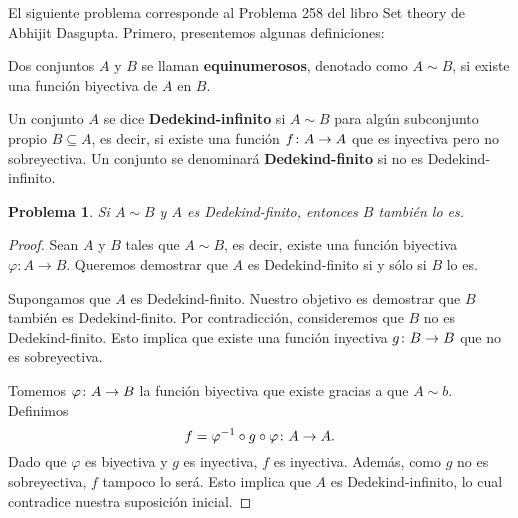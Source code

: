 \documentclass[a4,10pt]{aleph-notas}
\newtheorem*{prob}{Problema}
\begin{document}
\encabezado

\noindent
El siguiente problema corresponde al Problema 258 del libro Set theory de Abhijit Dasgupta. Primero, presentemos algunas definiciones:

\begin{defi}
    Dos conjuntos $A$ y $B$ se llaman \textbf{equinumerosos}, denotado como $A \sim B$, si existe una función biyectiva de $A$ en $B$.
\end{defi}

\begin{defi}
    Un conjunto $A$ se dice \textbf{Dedekind-infinito} si $A \sim B$ para algún subconjunto propio $B \subseteq A$, es decir, si existe una función $f\colon A \rightarrow A$ que es inyectiva pero no sobreyectiva. Un conjunto se denominará \textbf{Dedekind-finito} si no es Dedekind-infinito.
\end{defi}

\begin{prob}
    Si $A\sim B$ y $A$ es Dedekind-finito, entonces $B$ también lo es.
\end{prob}

\begin{proof}
    Sean \( A \) y \( B \) tales que \( A \sim B \), es decir, existe una función biyectiva \( \varphi: A \to B \). Queremos demostrar que \( A \) es Dedekind-finito si y sólo si \( B \) lo es.

    Supongamos que \( A \) es Dedekind-finito. Nuestro objetivo es demostrar que \( B \) también es Dedekind-finito. Por contradicción, consideremos que \( B \) no es Dedekind-finito. Esto implica que existe una función inyectiva \( g\colon B \rightarrow B \) que no es sobreyectiva. 

    Tomemos $\varphi\colon A \rightarrow B$ la función biyectiva que existe gracias a que $A\sim b$. Definimos 
    \[
        f=\varphi^{-1} \circ g \circ \varphi\colon A \rightarrow A. 
    \]
    Dado que \( \varphi \) es biyectiva y $g$ es inyectiva, \( f \) es inyectiva. Además, como \( g \) no es sobreyectiva, \( f \) tampoco lo será. Esto implica que \( A \) es Dedekind-infinito, lo cual contradice nuestra suposición inicial.

\end{proof}
    
\end{document}
